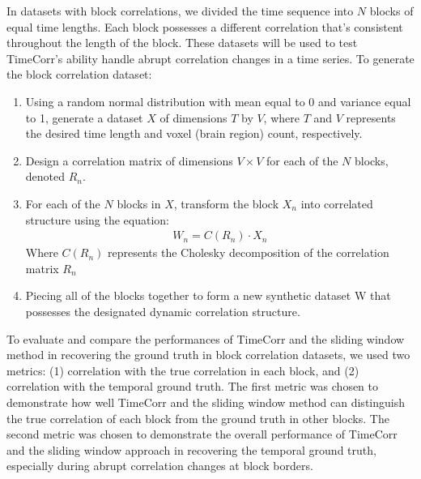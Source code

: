 \documentclass[11pt]{article}
\begin{document}
\begin{enumerate}
In datasets with block correlations, we divided the time sequence into $N$ blocks of equal time lengths. Each block possesses a different correlation that's consistent throughout the length of the block. These datasets will be used to test TimeCorr's ability handle abrupt correlation changes in a time series. To generate the block correlation dataset:
\begin{enumerate}
\item Using a random normal distribution with mean equal to 0 and variance equal to 1, generate a dataset $X$ of dimensions $T$ by $V$, where $T$ and $V$ represents the desired time length and voxel (brain region) count, respectively.
\item Design a correlation matrix of dimensions $V\times V$ for each of the $N$ blocks, denoted $R_n$.
\item For each of the $N$ blocks in $X$, transform the block $X_n$ into correlated structure using the equation:
\begin{align*}
W_n = C(R_n) \cdot X_n
\end{align*}
Where $C(R_n)$ represents the Cholesky decomposition of the correlation matrix $R_n$
\item Piecing all of the blocks together to form a new synthetic dataset W that possesses the designated dynamic correlation structure.
\end{enumerate}

To evaluate and compare the performances of TimeCorr and the sliding window method in recovering the ground truth in block correlation datasets, we used two metrics: (1) correlation with the true correlation in each block, and (2) correlation with the temporal ground truth. The first metric was chosen to demonstrate how well TimeCorr and the sliding window method can distinguish the true correlation of each block from the ground truth in other blocks. The second metric was chosen to demonstrate the overall performance of TimeCorr and the sliding window approach in recovering the temporal ground truth, especially during abrupt correlation changes at block borders.


\end{enumerate}
\end{document}
